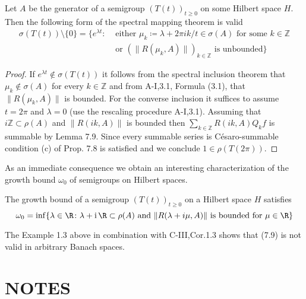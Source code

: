 \begin{theorem}\label{thm:a3-7.10}
Let $A$ be the generator of a semigroup $(T(t))_{t\geq 0}$ on some Hilbert space $H$.
Then the following form of the spectral mapping theorem is valid
\begin{align*}
\sigma(T(t))\setminus\{0\} = \{e^{\lambda t} \colon  
& \text{ either } \mu_{k}\coloneqq \lambda + 2\pi i k/t \in \sigma(A) \text{ for some } k \in \mathbb{Z}\\
& \text{ or } (\|R(\mu_{k},A)\|)_{k\in\mathbb{Z}} \text{ is unbounded}\}
\end{align*}
\end{theorem}

\begin{proof}
If $e^{\lambda t} \not\in \sigma(T(t))$ it follows from the spectral inclusion theorem that $\mu_{k} \not\in \sigma(A)$ for every $k \in \mathbb{Z}$ and from A-I,3.1, Formula (3.1), that $\|R(\mu_{k},A)\|$ is bounded.
For the converse inclusion it suffices to assume $t = 2\pi$ and $\lambda = 0$ (use the rescaling procedure A-I,3.1).
Assuming that $i\mathbb{Z} \subset \rho(A)$ and $\|R(ik,A)\|$ is bounded then $\sum_{k\in\mathbb{Z}} R(ik,A)Q_{k}f$ is summable by Lemma 7.9.
Since every summable series is Césaro-summable condition (c) of Prop. 7.8 is satisfied and we conclude $1 \in \rho(T(2\pi))$.
\end{proof}

\newpage
As an immediate consequence we obtain an interesting characterization of the growth bound $\omega_{0}$ of semigroups on Hilbert spaces.

\begin{corollary}\label{cor:a3-7.11}
The growth bound of a semigroup $(T(t))_{t\geq 0}$ on a Hilbert space $H$ satisfies
\begin{equation}\label{eq:a3-7.9}
\omega_{0} = \inf \{\lambda \in \R \colon \lambda + \mathrm{i}\,\R \subset \rho(A) \text{ and } \|R(\lambda+i\mu,A)\| \text{ is bounded for } \mu \in \R\}
\end{equation}
\end{corollary}

The Example 1.3 above in combination with C-III,Cor.1.3 shows that (7.9) is not valid in arbitrary Banach spaces.

\section*{NOTES}

